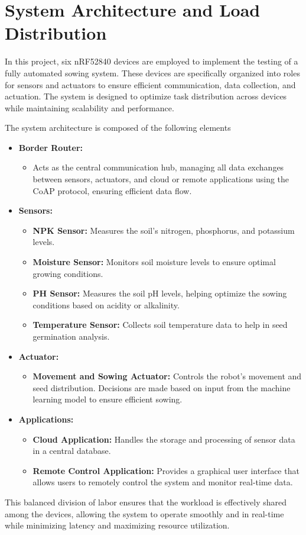 \chapter{System Architecture and Load Distribution}

In this project, six nRF52840 devices are employed to implement the testing of a fully automated sowing system. These devices are specifically organized into roles for sensors and actuators to ensure efficient communication, data collection, and actuation. The system is designed to optimize task distribution across devices while maintaining scalability and performance.

The system architecture is composed of the following elements

\begin{itemize} 
    \item \textbf{Border Router:} 
    \begin{itemize} 
        \item Acts as the central communication hub, managing all data exchanges between sensors, actuators, and cloud or remote applications using the CoAP protocol, ensuring efficient data flow. 
    \end{itemize} 
    \item \textbf{Sensors:} 
    \begin{itemize} 
        \item \textbf{NPK Sensor:} Measures the soil's nitrogen, phosphorus, and potassium levels. 
        \item \textbf{Moisture Sensor:} Monitors soil moisture levels to ensure optimal growing conditions. 
        \item \textbf{PH Sensor:} Measures the soil pH levels, helping optimize the sowing conditions based on acidity or alkalinity. 
        \item \textbf{Temperature Sensor:} Collects soil temperature data to help in seed germination analysis. 
    \end{itemize} \item \textbf{Actuator:} 
    \begin{itemize} \item \textbf{Movement and Sowing Actuator:} Controls the robot’s movement and seed distribution. Decisions are made based on input from the machine learning model to ensure efficient sowing. 
    \end{itemize} \item \textbf{Applications:} 
    \begin{itemize} \item \textbf{Cloud Application:} Handles the storage and processing of sensor data in a central database. 
        \item \textbf{Remote Control Application:} Provides a graphical user interface that allows users to remotely control the system and monitor real-time data. 
    \end{itemize} 
\end{itemize}

This balanced division of labor ensures that the workload is effectively shared among the devices, allowing the system to operate smoothly and in real-time while minimizing latency and maximizing resource utilization.